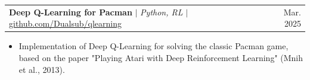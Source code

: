 \documentclass[a4paper,11pt]{article}
\makeatletter
\newcommand{\resumeItem}[1]{
  \item\small{
    {#1 \vspace{-2pt}}
  }
}
\newcommand{\resumeProjectHeading}[2]{
    \item
    \begin{tabular*}{0.97\textwidth}{l@{\extracolsep{\fill}}r}
      \small#1 & #2 \\
    \end{tabular*}\vspace{-7pt}
}
\newcommand{\resumeItemListStart}{\begin{itemize}}
\newcommand{\resumeItemListEnd}{\end{itemize}\vspace{-5pt}}
\makeatother
\begin{document}





\resumeProjectHeading
{\textbf{Deep Q-Learning for Pacman} $|$ \emph{Python, RL} $|$ \href{https://github.com/Dualsub/qlearning}{\underline{github.com/Dualsub/qlearning}}}{Mar. 2025}
\resumeItemListStart
\resumeItem{Implementation of Deep Q-Learning for solving the classic Pacman game, based on the paper "Playing Atari with Deep Reinforcement Learning" (Mnih et al., 2013).}
\resumeItemListEnd
\end{document}
